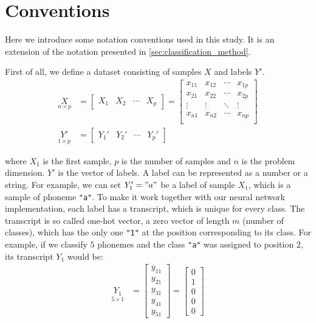 \chapter{Conventions} \label{app:implementation}
Here we introduce some notation conventions used in this study. It is an extension of the notation presented in \cref{sec:classification_method}.

First of all, we define a dataset consisting of samples $ X $ and labels $ Y' $.
\begin{align*}
\underset{n\times p}{X} &= 
\begin{bmatrix}
    X_1 & X_2 & \cdots & X_p
\end{bmatrix} =
\begin{bmatrix}
    x_{11} & x_{12} & \cdots & x_{1p} \\
    x_{21} & x_{22} & \cdots & x_{2p} \\
    \vdots & \vdots & \ddots & \vdots \\
    x_{n1} & x_{n2} & \cdots & x_{np} \\      
\end{bmatrix}\\
\underset{1\times p}{Y'} &= 
\begin{bmatrix}
    Y_{1}' & Y_{2}' & \cdots & Y_{p}'
\end{bmatrix}
\end{align*}


where $ X_1 $ is the first sample, $ p $ is the number of samples and $ n $ is the problem dimension. $ Y' $ is the vector of labels. A label can be represented as a number or a string. For example, we can set $ Y_1' = "a" $ be a label of sample $ X_1 $, which is a sample of phoneme \texttt{"a"}. To make it work together with our neural network implementation, each label has a transcript, which is unique for every class. The transcript is so called one-hot vector, a zero vector of length $ m $ (number of classes), which has the only one \texttt{"1"} at the position corresponding to its class. For example, if we classify $ 5 $ phonemes and the class \texttt{"a"} was assigned to position $ 2 $, its transcript $ Y_1 $ would be:
\begin{align*}
\underset{5\times 1}{Y_1} &= 
\begin{bmatrix}
    y_{11} \\ y_{21} \\ y_{31} \\ y_{41} \\ y_{51}
\end{bmatrix} = 
\begin{bmatrix}
    0 \\ 1 \\ 0 \\ 0 \\ 0 
\end{bmatrix}
\end{align*}

